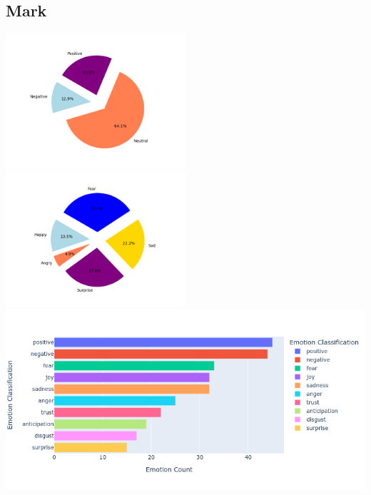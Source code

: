 \documentclass[a4paper,12pt]{article}
\begin{document}
	\subsection{Mark}
	{\includegraphics[height=5cm]{marksVaderEmotionalPie.png}}
	{\includegraphics[height=5cm]{marksEmotionalPie.png}}\\
	{\includegraphics[width=17cm]{markNrcImage.png}}\\
	\clearpage
\end{document}

